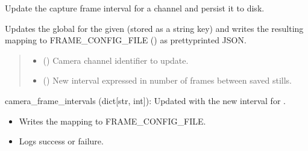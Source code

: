 \documentclass[letterpaper,10pt,english]{sphinxmanual}
\begin{document}
\begin{fulllineitems}
\label{\detokenize{modules/src.data_intake.data_intake.NVRConnection:src.data_intake.data_intake.NVRConnection.change_frame_interval}}
\pysigstartsignatures
\pysiglinewithargsret
{}
{\sphinxparamcomma {}}
{}
\pysigstopsignatures
\sphinxAtStartPar
Update the capture frame interval for a channel and persist it to disk.

\sphinxAtStartPar
Updates the global  for the given  (stored as a
string key) and writes the resulting mapping to FRAME\_CONFIG\_FILE ()
as pretty\sphinxhyphen{}printed JSON.
\begin{quote}\begin{description}
\begin{itemize}
\item {} 
\sphinxAtStartPar
{} () \textendash{} Camera channel identifier to update.

\item {} 
\sphinxAtStartPar
{} () \textendash{} New interval expressed in number of frames between saved stills.

\end{itemize}

\end{description}\end{quote}
\begin{description}
\sphinxAtStartPar
camera\_frame\_intervals (dict{[}str, int{]}): Updated with the new interval for .

\begin{itemize}
\item {} 
\sphinxAtStartPar
Writes the  mapping to FRAME\_CONFIG\_FILE.

\item {} 
\sphinxAtStartPar
Logs success or failure.


\end{itemize}
\end{description}
\end{fulllineitems}
\end{document}
